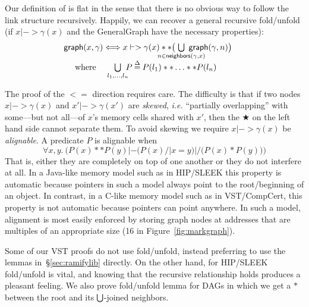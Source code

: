Our definition of  is flat in the sense that there is no obvious way to follow the link structure recursively.  Happily, we can recover a general recursive fold/unfold (if $x |-> \gamma(x)$ and the GeneralGraph have the necessary properties):
\vspace{-1ex}
\begin{equation}
\label{eqn:unfold_graph}
\hspace{-1em}\begin{array}{@{}lc@{\hspace{1pt}}c@{\hspace{1pt}}l@{}}
\p{graph}(x,\gamma)  <=>  x |-> \gamma(x) ** \big(\!\!\!\!\!\!\!\!\!\!\!\!\!\underset{n \in \p{neighbors}(\gamma,x)}{\raisebox{-0.3ex}{\resizebox{0.75em}{!}{$\scon$}} \hspace{-2.18ex} \bigcup}\!\!\!\!\!\!\!\!\!\!\!\! \p{graph}(\gamma,n) \big) \\
[2pt]
\text{~~~ where ~~ }\underset{l_1,\dots,l_n}{\raisebox{-0.3ex}{\resizebox{0.75em}{!}{$\scon$}}\hspace{-2.18ex} \bigcup} \! \! P  \defeq  P(l_1) ** \ldots ** P(l_n) \end{array}
\vspace{-1ex}
\end{equation}

The proof of the $<=$ direction requires care. The difficulty is that if two nodes $x |-> \gamma(x)$ and $x' |-> \gamma(x')$ are \emph{skewed}, \emph{i.e.} ``partially overlapping'' with some---but not all---of $x$'s memory cells shared with $x'$, then the $\bigstar$ on the left hand side cannot separate them.  To avoid skewing we require $x |-> \gamma(x)$ be \emph{alignable}.  A predicate $P$ is alignable when
\[
\forall x,y.~ \Big(P(x) ** P(y) |- \big(P(x) /| x = y\big) |/ \big(P(x) * P(y)\big)\Big)
\]
That is, either they are completely on top of one another or they do not interfere at all.  In a Java-like memory model such as in HIP/SLEEK this property is automatic because pointers in such a model always point to the root/beginning of an object.  In contrast, in a C-like memory model such as in VST/CompCert, this property is not automatic because pointers can point anywhere.  In such a model, alignment is most easily enforced by storing graph nodes at addresses that are multiples of an appropriate size (16 in Figure~\ref{fig:markgraph}).

Some of our VST proofs do not use fold/unfold, instead preferring to use the lemmas in~\S\ref{sec:ramifylib} directly.  On the other hand, for HIP/SLEEK fold/unfold is vital, and knowing that the recursive relationship holds produces a pleasant feeling.  We also prove fold/unfold lemma for DAGs in which we get a $*$ between the root and its $\medocon$-joined neighbors. %

